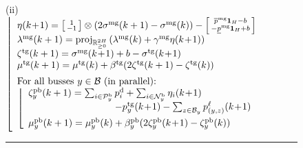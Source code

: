 \documentclass{IEEEtran}  %
\newcommand{\mc}{\mathcal}
\newcommand{\bb}{\mathbb}
\newcommand{\R}{\bb R}
\newcommand{\proj}{\mathrm{proj}}
\newcommand{\0}{\mathbf{0}}
\newcommand{\1}{\mathbf{1}}
\begin{document}
\begin{figure}[t]
{\begin{minipage}{\columnwidth}
\medskip
\noindent
\noindent 
(ii) \\[.2em]
\hspace*{.15em}
$
\left\lfloor
\begin{array}{l}
%
\eta(k\!+\!1) = 
	\left[
	\begin{smallmatrix}
	1\\
	- 1 
	\end{smallmatrix}
	\right] \otimes (2 \sigma^{\text{mg}}(k+1)- \sigma^{\text{mg}}(k)) 
	-
	\left[
	\begin{smallmatrix}
	\overline{p}^{\mathrm{mg}}\1_{H}-b \\
	-     \underline{p}^{\mathrm{mg}} \1_{H}+b
	\end{smallmatrix} 
	\right]\\
	\lambda^{\text{mg}}(k+1) = \textstyle
	\proj_{\R^{2 H}_{\geq 0}}\left( 
	\lambda^{\text{mg}}(k) + \gamma^{\text{mg}} \eta(k\!+\!1)
	 \right)\\
%
\zeta^{\text{tg}}(k+1) = \sigma^{\text{mg}}
	(k\!+\!1)+b- \sigma^{\text{tg}}(k\!+\!1)\\
	\mu^{\text{tg}}(k+1) = \mu^{\text{tg}}(k) + \beta^{\text{tg}} (2\zeta^{\text{tg}}(k+1)-\zeta^{\text{tg}}(k))\\[.5em]
\text{For all busses } y \in \mc B \text{ (in parallel):}\\
\left\lfloor
\begin{array}{l}
\zeta^{\text{pb}}_y(k+1)   = \sum_{i \in \mc P_y^{\mathrm{b}}} p_i^{\mathrm{d}} + \sum_{i \in \mc N_y^{\mathrm{b}}} \eta_i(k\!+\!1)\\
\hspace*{9em} - p^{\text{tg}}_y(k\!+\!1) - \sum_{z \in \mc B_y} p^\ell_{(y,z)} (k\!+\!1)\\[.5em]
%
\mu_y^{\text{pb}}(k+1) = \mu_y^{\text{pb}}(k) + \beta^{\text{pb}}_y (2 \zeta^{\text{pb}}_y(k\!+\!1)- \zeta^{\text{pb}}_y(k))
\end{array}
\right.
\vspace*{.2em}
\end{array}
\right.
$

\medskip
\hrule
\end{minipage}
}
\end{figure}
\end{document}
